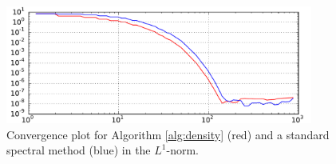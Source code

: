\documentclass[final,leqno]{siamltex1213}
\begin{document}
\begin{figure}
	\hspace*{-1.2cm}
	\centering
	\includegraphics[width=0.9\textwidth]{./images/convergence_plot.pdf}
	\caption{Convergence plot for Algorithm \ref{alg:density} (red) and a standard spectral method (blue) in the $L^{1}$-norm.}
	\label{fig:convergence}
\end{figure}

%
\end{document}
